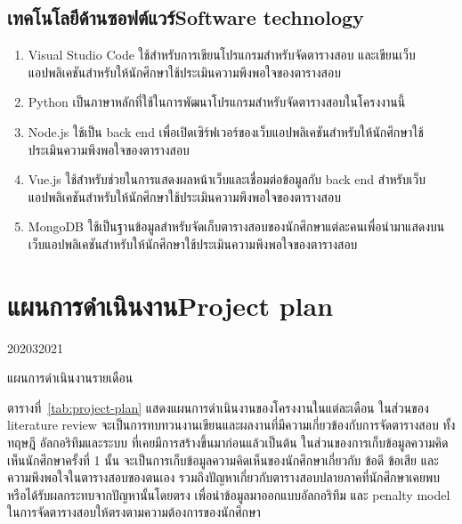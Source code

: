 \subsection{\ifcpe เทคโนโลยีด้านซอฟต์แวร์\else Software technology\fi}
\begin{enumerate}
    \item Visual Studio Code ใช้สำหรับการเขียนโปรแกรมสำหรับจัดตารางสอบ และเขียนเว็บแอปพลิเคชันสำหรับให้นักศึกษาใช้ประเมินความพึงพอใจของตารางสอบ
    \item Python เป็นภาษาหลักที่ใช้ในการพัฒนาโปรแกรมสำหรับจัดตารางสอบในโครงงานนี้
    \item Node.js ใช้เป็น back end เพื่อเปิดเซิร์ฟเวอร์ของเว็บแอปพลิเคชันสำหรับให้นักศึกษาใช้ประเมินความพึงพอใจของตารางสอบ
    \item Vue.js ใช้สำหรับช่วยในการแสดงผลหน้าเว็บและเชื่อมต่อข้อมูลกับ back end สำหรับเว็บแอปพลิเคชันสำหรับให้นักศึกษาใช้ประเมินความพึงพอใจของตารางสอบ
    \item MongoDB ใช้เป็นฐานข้อมูลสำหรับจัดเก็บตารางสอบของนักศึกษาแต่ละคนเพื่อนำมาแสดงบนเว็บแอปพลิเคชันสำหรับให้นักศึกษาใช้ประเมินความพึงพอใจของตารางสอบ
\end{enumerate}

\section{\ifcpe แผนการดำเนินงาน\else Project plan\fi}
\begin{table}
    \begin{plan}{7}{2020}{3}{2021}
    \end{plan}
    \caption{แผนการดำเนินงานรายเดือน}
    \label{tab:project-plan}
\end{table}
%
ตารางที่~\ref{tab:project-plan} แสดงแผนการดำเนินงานของโครงงานในแต่ละเดือน ในส่วนของ literature review จะเป็นการทบทวนงานเขียนและผลงานที่มีความเกี่ยวข้องกับการจัดตารางสอบ
ทั้งทฤษฎี อัลกอริทึมและระบบ ที่เคยมีการสร้างขึ้นมาก่อนแล้วเป็นต้น ในส่วนของการเก็บข้อมูลความคิดเห็นนักศึกษาครั้งที่ 1 นั้น
จะเป็นการเก็บข้อมูลความคิดเห็นของนักศึกษาเกี่ยวกับ ข้อดี ข้อเสีย และความพึงพอใจในตารางสอบของตนเอง รวมถึงปัญหาเกี่ยวกับตารางสอบปลายภาคที่นักศึกษาเคยพบหรือได้รับผลกระทบจากปัญหานั้นโดยตรง
เพื่อนำข้อมูลมาออกแบบอัลกอริทึม และ penalty model ในการจัดตารางสอบให้ตรงตามความต้องการของนักศึกษา


